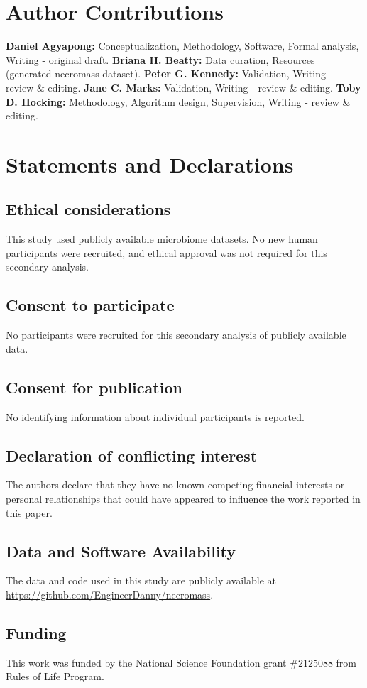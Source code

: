 \documentclass[]{Liebert_Author_revised}
\providecommand{\DIFadd}[1]{{\ifmmode\else\leavevmode\fi\color{blue}#1}} %
\providecommand{\DIFaddbegin}{} %
\providecommand{\DIFaddend}{} %
\begin{document}
\section*{\DIFadd{Author Contributions}}
\DIFaddend \textbf{Daniel Agyapong:} Conceptualization, Methodology, Software, Formal analysis, Writing - original draft.
\textbf{Briana H. Beatty:} Data curation, Resources (generated necromass dataset).
\textbf{Peter G. Kennedy:} Validation, Writing - review \& editing.
\textbf{Jane C. Marks:} Validation, Writing - review \& editing.
\textbf{Toby D. Hocking:} Methodology, Algorithm design, Supervision, Writing - review \& editing.

\DIFaddbegin \section*{\DIFadd{Statements and Declarations}}
\subsection*{\DIFadd{Ethical considerations}}
\DIFadd{This study used publicly available microbiome datasets. No new human participants were recruited, and ethical approval was not required for this secondary analysis.
}

\subsection*{\DIFadd{Consent to participate}}
\DIFadd{No participants were recruited for this secondary analysis of publicly available data.
}

\subsection*{\DIFadd{Consent for publication}}
\DIFadd{No identifying information about individual participants is reported.
}

\DIFaddend \subsection*{Declaration of  \DIFaddbegin \DIFadd{conflicting interest}\DIFaddend }
The authors declare that they have no known competing financial interests or personal relationships that could have appeared to influence the work reported in this paper.

\subsection*{ \DIFaddbegin \DIFadd{Data }\DIFaddend and  \DIFaddbegin \DIFadd{Software Availability}\DIFaddend }
The data and code used in this study are publicly available at \url{https://github.com/EngineerDanny/necromass}.

\subsection*{Funding}
This work was funded by the National Science Foundation grant \#2125088 from Rules of Life Program.



 \DIFaddbegin 
\DIFaddend 
\end{document}

